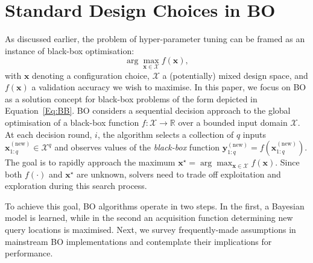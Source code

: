 \documentclass[jair,twoside,11pt,theapa]{article}
\theoremstyle{definition}
\begin{document}
\section{Standard Design Choices in BO}  
As discussed earlier, the problem of hyper-parameter tuning can be framed as an instance of black-box optimisation:
\begin{equation}
\label{Eq:BB}
 \arg\max_{\bm{x} \in \mathcal{X}} f(\bm{x}),  
\end{equation}
with $\bm{x}$ denoting a configuration choice, $\mathcal{X}$ a (potentially) mixed design space, and $f(\bm{x})$ a validation accuracy we wish to maximise. In this paper, we focus on BO as a solution concept for black-box problems of the form depicted in Equation~\ref{Eq:BB}. BO considers a sequential decision approach to the global optimisation of a black-box function $f: \mathcal{X} \rightarrow \mathbb{R}$ over a bounded input domain $\mathcal{X}$. At each decision round, $i$, the algorithm selects a collection of $q$ inputs $\bm{x}^{(\text{new})}_{1:q} \in \mathcal{X}^q$ and observes values of the \emph{black-box} function $\bm{y}^{(\text{new})}_{1:q} = f(\bm{x}^{(\text{new})}_{1:q})$. The goal is to rapidly approach the maximum $\bm{x}^{\star} = \arg\max_{\bm{x} \in \mathcal{X}} f(\bm{x})$. Since both $f(\cdot)$ and $\bm{x}^{\star}$ are unknown, solvers need to trade off exploitation and exploration during this search process. 

To achieve this goal, BO algorithms operate in two steps. In the first, a Bayesian model is learned, while in the second an acquisition function determining new query locations is maximised. Next, we survey frequently-made assumptions in mainstream BO implementations and contemplate their implications for performance.
\end{document}
